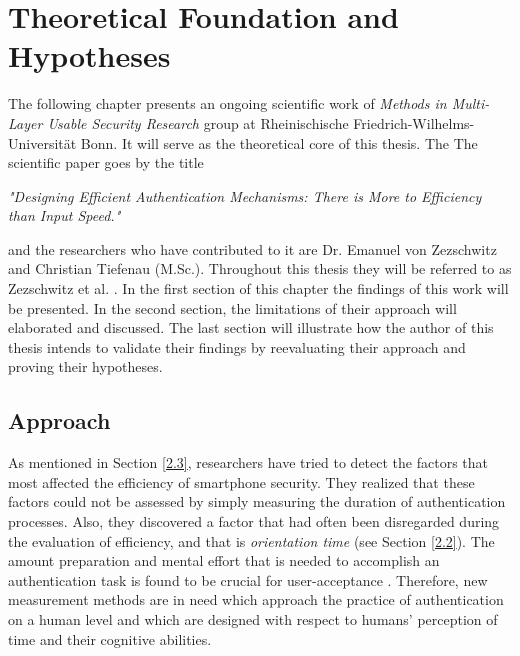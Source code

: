 
\chapter{Theoretical Foundation and Hypotheses}\label{ch:third}


The following chapter presents an ongoing scientific work of \textit{Methods in Multi-Layer Usable Security Research} group at Rheinischische Friedrich-Wilhelms-Universit{\"a}t Bonn. It will serve as the theoretical core of this thesis. The The scientific paper goes by the title 
\begin{center}
 \textit{"Designing Efficient Authentication Mechanisms: There is More to Efficiency than Input Speed."}   
\end{center}

and the researchers who have contributed to it are Dr. Emanuel von Zezschwitz and Christian Tiefenau (M.Sc.). Throughout this thesis they will be referred to as Zezschwitz et al. \cite{Zezschwitz}.
In the first section of this chapter the findings of this work will be presented. In the second section, the limitations of their approach will elaborated and discussed. The last section will illustrate how the author of this thesis intends to validate their findings by reevaluating their approach and proving their hypotheses.

\section{Approach}

As mentioned in Section \ref{2.3}, researchers have tried to detect the factors that most affected the efficiency of smartphone security. They realized that these factors could not be assessed by simply measuring the duration of authentication processes. Also, they discovered a factor that had often been disregarded during the evaluation of efficiency, and that is \textit{orientation time} (see Section \ref{2.2}). The amount preparation and mental effort that is needed to accomplish an authentication task is found to be crucial for user-acceptance \cite{Zezschwitz}. Therefore, new measurement methods are in need which approach the practice of authentication on a human level and which are designed with respect to humans' perception of time and their cognitive abilities. \\

